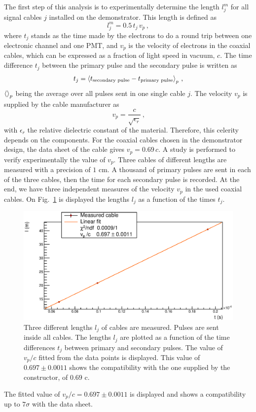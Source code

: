 The first step of this analysis is to experimentally determine the length $l_{j}^{m}$ for all signal cables $j$ installed on the demonstrator.
This length is defined as
\begin{equation}
  l_{j}^{m}= 0.5\,t_{j}\,v_{p}\, ,
\end{equation}
where $t_{j}$ stands as the time made by the electrons to do a round trip between one electronic channel and one PMT, and $v_{p}$ is the velocity of electrons in the coaxial cables, which can be expressed as a fraction of light speed in vacuum, $c$.
The time difference $t_{j}$ between the primary pulse and the secondary pulse is written as
\begin{equation}
  t_{j} = \braket{t_{\text{secondary pulse}}-t_{\text{primary pulse}}}_{p} \, \text{,}
\end{equation}
$\braket{}_{p}$ being the average over all pulses sent in one single cable $j$.
The velocity $v_{p}$ is supplied by the cable manufacturer as
\begin{equation*}
  v_{p}=\frac{c}{\sqrt{\epsilon_{r}}}\,\text{,}
\end{equation*}
with $\epsilon_{r}$ the relative dielectric constant of the material.
Therefore, this celerity depends on the components.
For the coaxial cables chosen in the demonstrator design, the data sheet of the cable gives ${v_{p}=0.69\,c}$.
A study is performed to verify experimentally the value of $v_{p}$.
Three cables of different lengths are measured with a precision of $1$ cm.
A thousand of primary pulses are sent in each of the three cables, then the time for each secondary pulse is recorded.
At the end, we have three independent measures of the velocity $v_{p}$ in the used coaxial cables.
On Fig.~\ref{fig:celerity} is displayed the lengths $l_{j}$ as a function of the times $t_{j}$.
\begin{figure}
  \centering
  \includegraphics[width=15cm]{commissioning/fig_commissioning/celerity.eps}
  \caption{Three different lengths $l_{j}$ of cables are measured.
    Pulses are sent inside all cables.
    The lengths $l_{j}$ are plotted as a function of the time differences $t_{j}$ between primary and secondary pulses.
    The value of $v_{p}/c$ fitted from the data points is displayed.
    This value of $0.697\pm 0.0011$ shows the compatibility with the one supplied by the constructor, of $0.69$ c.
    \label{fig:celerity}}
\end{figure}
The fitted value of $v_{p}/c = 0.697\pm 0.0011$ is displayed and shows a compatibility up to $7\sigma$ with the data sheet.

